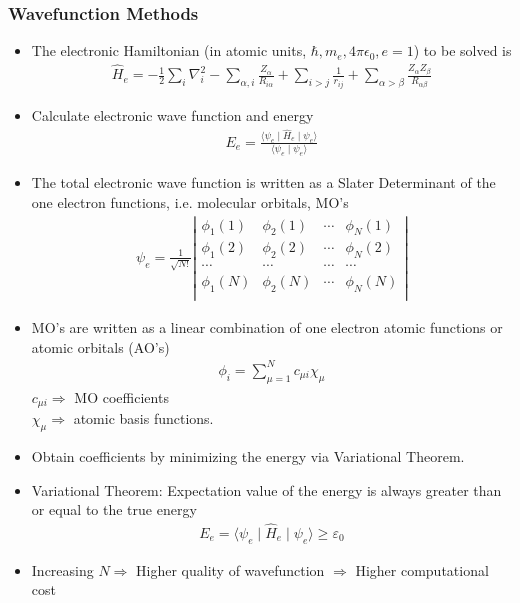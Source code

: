 \documentclass[slidestop,mathserif,compress,xcolor=svgnames]{beamer}
\begin{document}
\begin{frame}[allowframebreaks]
\frametitle{\small Wavefunction Methods}
\footnotesize{
\begin{itemize}
\item The electronic Hamiltonian (in atomic units, $\hbar,m_e,4\pi\epsilon_0,e=1$) to be solved is 
\begin{align*}
\hat{H}_e = -\frac{1}{2}\sum_i\nabla^2_i - \sum_{\alpha,i}\frac{Z_\alpha}{R_{i\alpha}} + \sum_{i>j}\frac{1}{r_{ij}} + \sum_{\alpha>\beta}\frac{Z_\alpha Z_\beta}{R_{\alpha\beta}}
\end{align*}
\item Calculate electronic wave function and energy
\begin{align*}
E_e = \frac{\langle\psi_e\mid\hat{H}_e\mid\psi_e\rangle}{\langle\psi_e\mid\psi_e\rangle}
\end{align*}
\item The total electronic wave function is written as a Slater Determinant of the one electron functions, i.e. molecular orbitals, MO's
\begin{align*}
\psi_e = \frac{1}{\sqrt{N!}}\left| \begin{array}{cccc}
\phi_1(1) & \phi_2(1) & \cdots & \phi_N(1)\\
\phi_1(2) & \phi_2(2) & \cdots & \phi_N(2)\\
\cdots & \cdots & \cdots & \cdots \\
\phi_1(N) & \phi_2(N) & \cdots & \phi_N(N)\\
\end{array} \right|
\end{align*}
\item MO's are written as a linear combination of one electron atomic functions or atomic orbitals (AO's)
\begin{align*}
\phi_i = \sum^N_{\mu=1}c_{\mu i}\chi_\mu
\end{align*}
$c_{\mu i} \Rightarrow$ MO coefficients\\
$\chi_\mu\Rightarrow$ atomic basis functions.
\item Obtain coefficients by minimizing the energy via Variational Theorem.
\item Variational Theorem: Expectation value of the energy is always greater than or equal to the true energy
\begin{align*}
E_e = \langle\psi_e\mid\hat{H}_e\mid\psi_e\rangle \ge \varepsilon_0
\end{align*}
\item Increasing $N \Rightarrow$ Higher quality of wavefunction $\Rightarrow$ Higher computational cost
\end{itemize}
}
\end{frame}
\end{document}
